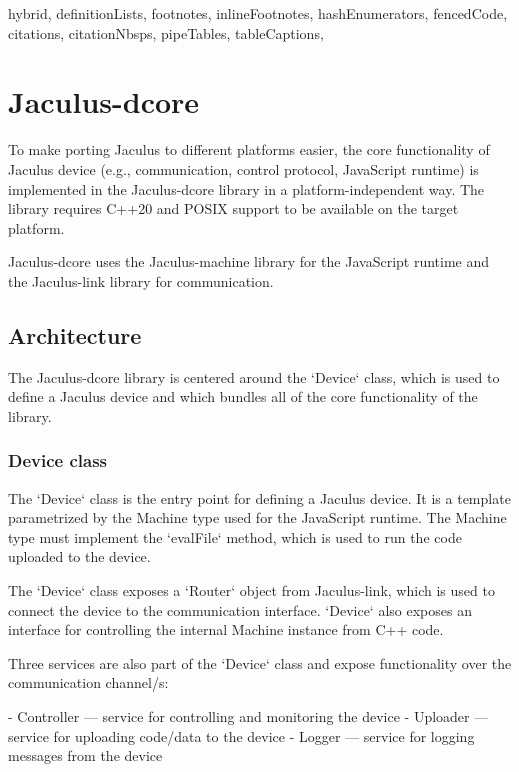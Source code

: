 \begin{markdown*}{%
  hybrid,
  definitionLists,
  footnotes,
  inlineFootnotes,
  hashEnumerators,
  fencedCode,
  citations,
  citationNbsps,
  pipeTables,
  tableCaptions,
}

\chapter{Jaculus-dcore}

To make porting Jaculus to different platforms easier, the core functionality of Jaculus device (e.g., communication, control protocol, JavaScript runtime) is implemented in the Jaculus-dcore library in a platform-independent way. The library requires C++20 and POSIX support to be available on the target platform.

Jaculus-dcore uses the Jaculus-machine library for the JavaScript runtime and the Jaculus-link library for communication.

\section{Architecture}

The Jaculus-dcore library is centered around the `Device` class, which is used to define a Jaculus device and which bundles all of the core functionality of the library.

\subsection{Device class}

The `Device` class is the entry point for defining a Jaculus device. It is a template parametrized by the Machine type used for the JavaScript runtime. The Machine type must implement the `evalFile` method, which is used to run the code uploaded to the device.

The `Device` class exposes a `Router` object from Jaculus-link, which is used to connect the device to the communication interface. `Device` also exposes an interface for controlling the internal Machine instance from C++ code.

Three services are also part of the `Device` class and expose functionality over the communication channel/s:

  - Controller --- service for controlling and monitoring the device
  - Uploader --- service for uploading code/data to the device
  - Logger --- service for logging messages from the device


\end{markdown*}
